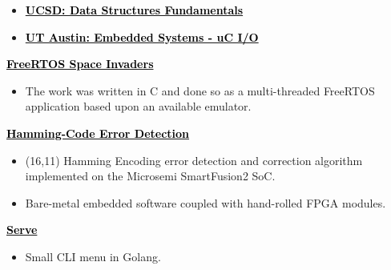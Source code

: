 \documentclass[10pt,a4paper,ragged2e,withhyper]{altacv}
\begin{document}
\begin{paracol}{2}
\divider

\divider

\divider


\begin{itemize}
	\item 
        \href{https://courses.edx.org/certificates/f9250573933e4a3e87e8b28ea989bf99}{\textbf{{\textcolor{black}{UCSD: Data Structures Fundamentals}}}}
	\item 
        \href{https://courses.edx.org/certificates/af6115bce0c646aa95f6aaa6c98acb09}{\textbf{{\textcolor{black}{UT Austin: Embedded Systems - uC I/O}}}}
\end{itemize}



\href{https://github.com/duclos-cavalcanti/FreeRTOS-SpaceInvaders}
     {\textbf{{\textcolor{black}{FreeRTOS Space Invaders}}}}
\begin{itemize}
	\item The work was written in C and done so as a multi-threaded FreeRTOS application based upon an available emulator. 
\end{itemize}

\href{https://github.com/duclos-cavalcanti/microsemi-error-detection}
     {\textbf{{\textcolor{black}{Hamming-Code Error Detection}}}}
\begin{itemize}
    \item (16,11) Hamming Encoding error detection and correction algorithm implemented on the Microsemi SmartFusion2 SoC.
    \item Bare-metal embedded software coupled with hand-rolled FPGA modules.
\end{itemize}

\href{https://github.com/duclos-cavalcanti/serve}
     {\textbf{{\textcolor{black}{Serve}}}}
\begin{itemize}
	\item Small CLI menu in Golang.
\end{itemize}

\end{paracol}
\end{document}
